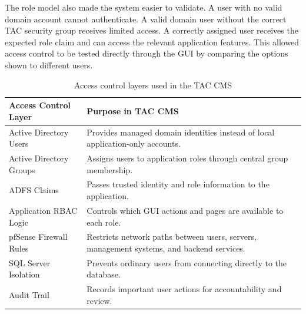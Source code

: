 \begin{table}[H]
\centering
\small
\renewcommand{\arraystretch}{1.2}
\caption{Role based access control matrix for the TAC CMS}
\label{tab:rbac-matrix}
\end{table}

The role model also made the system easier to validate. A user with no valid domain account cannot authenticate. A valid domain user without the correct TAC security group receives limited access. A correctly assigned user receives the expected role claim and can access the relevant application features. This allowed access control to be tested directly through the GUI by comparing the options shown to different users.

\begin{table}[H]
\centering
\small
\renewcommand{\arraystretch}{1.2}
\begin{tabularx}{\textwidth}{|p{4cm}|X|}
\hline
\textbf{Access Control Layer} & \textbf{Purpose in TAC CMS} \\
\hline
Active Directory Users & Provides managed domain identities instead of local application-only accounts. \\
\hline
Active Directory Groups & Assigns users to application roles through central group membership. \\
\hline
ADFS Claims & Passes trusted identity and role information to the application. \\
\hline
Application RBAC Logic & Controls which GUI actions and pages are available to each role. \\
\hline
pfSense Firewall Rules & Restricts network paths between users, servers, management systems, and backend services. \\
\hline
SQL Server Isolation & Prevents ordinary users from connecting directly to the database. \\
\hline
Audit Trail & Records important user actions for accountability and review. \\
\hline
\end{tabularx}
\caption{Access control layers used in the TAC CMS}
\label{tab:access-control-layers}
\end{table}

